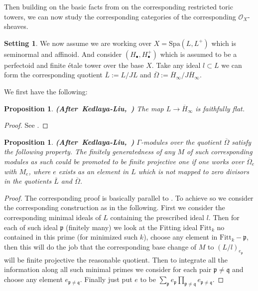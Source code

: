 \documentclass[12pt]{amsart}
\newtheorem{proposition}[theorem]{Proposition}
\theoremstyle{definition}
\numberwithin{equation}{section}
\newtheorem{setting}[theorem]{Setting}
\begin{document}
\indent Then building on the basic facts from \cite[Lemma 8.2.12, Corollary 8.2.15]{KL16} on the corresponding restricted toric towers, we can now study the corresponding categories of the corresponding $\mathcal{O}_X$-sheaves.



\begin{setting}
We now assume we are working over $X=\mathrm{Spa}(L,L^+)$ which is seminormal and affinoid. And consider $(H_\bullet,H_\bullet^+)$ which is assumed to be a perfectoid and finite \'etale tower over the base $X$. Take any ideal $l\subset L$ we can form the corresponding quotient $\overline{L}:=L/JL$ and $\overline{\Omega}:=\overline{H}_\infty/J\overline{H}_\infty$.
\end{setting}

\indent We first have the following:

\begin{proposition}\mbox{\bf{(After Kedlaya-Liu, \cite[Lemma 8.3.3]{KL16})}}
The map $L\rightarrow \overline{H}_\infty$ is faithfully flat. 
\end{proposition}


\begin{proof}
See \cite[Lemma 8.3.3]{KL16}.	
\end{proof}


\begin{proposition}\mbox{\bf{(After Kedlaya-Liu, \cite[Lemma 8.3.4]{KL16})}}
$\Gamma$-modules over the quotient $\overline{\Omega}$ satisfy the following property. The finitely generatedness of any $M$ of such corresponding modules as such could be promoted to be finite projective one if one works over $\overline{\Omega}_e$ with $M_e$, where $e$ exists as an element in $L$ which is not mapped to zero divisors in the quotients $\overline{L}$ and $\overline{\Omega}$.   	
\end{proposition}


\begin{proof}
The corresponding proof is basically parallel to \cite{KL16}. To achieve so we consider the corresponding construction as in the following. First we consider the corresponding minimal ideals of $L$ containing the prescribed ideal $l$. Then for each of such ideal $\mathfrak{p}$ (finitely many) we look at the Fitting ideal $\mathrm{Fitt}_k$ no contained in this prime (for minimized such $k$), choose any element in $\mathrm{Fitt}_k-\mathfrak{p}$, then this will do the job that the corresponding base change of $M$ to $(L/l)_{e_\mathfrak{p}}$ will be finite projective the reasonable quotient. Then to integrate all the information along all such minimal primes we consider for each pair $\mathfrak{p}\neq \mathfrak{q}$ and choose any element $e_{\mathfrak{p}\neq \mathfrak{q}}$. Finally just put $e$ to be $\sum_{\mathfrak{p}}e_\mathfrak{p}\prod_{\mathfrak{p}\neq \mathfrak{q}}e_{\mathfrak{p}\neq \mathfrak{q}}$.	
\end{proof}
\end{document}
